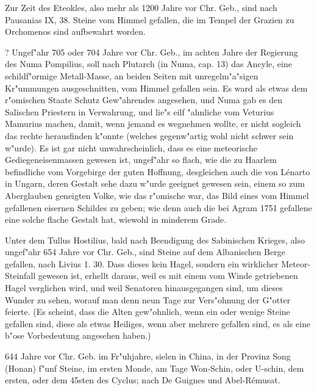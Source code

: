 \documentclass[a4paper, 11pt, oneside, polutonikogreek, german]{article}
\begin{document}
Zur Zeit des Eteokles, also mehr als 1200 Jahre vor Chr. Geb., sind nach Pausanias IX, 38. Steine vom Himmel gefallen, die im Tempel der Grazien zu Orchomenos sind aufbewahrt worden.

? Ungef"ahr 705 oder 704 Jahre vor Chr. Geb., im achten Jahre der Regierung des Numa Pompilius, soll nach Plutarch (in Numa, cap. 13) das Ancyle, eine schildf"ormige Metall-Masse, an beiden Seiten mit unregelm"a"sigen Kr"ummungen ausgeschnitten, vom Himmel gefallen sein. Es ward als etwas dem r"omischen Staate Schutz Gew"ahrendes angesehen, und Numa gab es den Salischen Priestern in Verwahrung, und lie"s eilf "ahnliche vom Veturius Mamurius machen, damit, wenn jemand es wegnehmen wollte, er nicht sogleich das rechte herausfinden k"onnte (welches gegenw"artig wohl nicht schwer sein w"urde). Es ist gar nicht unwahrscheinlich, dass es eine meteorische Gediegeneisenmassen gewesen ist, ungef"ahr so flach, wie die zu Haarlem befindliche vom Vorgebirge der guten Hoffnung, desgleichen auch die von Lénarto in Ungarn, deren Gestalt sehe dazu w"urde geeignet gewesen sein, einem so zum Aberglauben geneigten Volke, wie das r"omische war, das Bild eines vom Himmel gefallenen eisernen Schildes zu geben; wie denn auch die bei Agram 1751 gefallene eine solche flache Gestalt hat, wiewohl in minderem Grade.

Unter dem Tullus Hostilius, bald nach Beendigung des Sabinischen Krieges, also ungef"ahr 654 Jahre vor Chr. Geb., sind Steine auf dem Albanischen Berge gefallen, nach Livius 1. 30. Dass dieses kein Hagel, sondern ein wirklicher Meteor-Steinfall gewesen ist, erhellt daraus, weil es mit einem vom Winde getriebenen Hagel verglichen wird, und weil Senatoren hinausgegangen sind, um dieses Wunder zu sehen, worauf man denn neun Tage zur Vers"ohnung der G"otter feierte. (Es scheint, dass die Alten gew"ohnlich, wenn ein oder wenige Steine gefallen sind, diese als etwas Heiliges, wenn aber mehrere gefallen sind, es als eine b"ose Vorbedeutung angesehen haben.)

644 Jahre vor Chr. Geb. im Fr"uhjahre, sielen in China, in der Provinz Song (Honan) f"unf Steine, im ersten Monde, am Tage Won-Schin, oder U-schin, dem ersten, oder dem 45sten des Cyclus; nach De Guignes und Abel-Rémusat.
\end{document}
